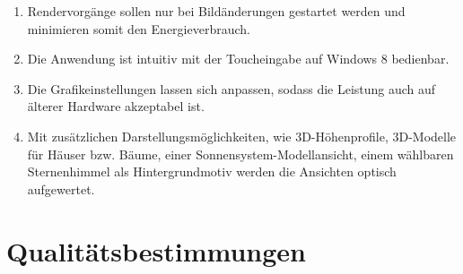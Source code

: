 \documentclass[10pt]{scrreprt}
\begin{document}
\begin{enumerate}[leftmargin=2.2cm]
\item Rendervorgänge sollen nur bei Bildänderungen gestartet werden und minimieren somit den Energieverbrauch.
\item Die Anwendung ist intuitiv mit der Toucheingabe auf Windows 8 bedienbar.
\item Die Grafikeinstellungen lassen sich anpassen, sodass die Leistung auch auf älterer Hardware akzeptabel ist.
\item Mit zusätzlichen Darstellungsmöglichkeiten, wie 3D-Höhenprofile, 3D-Modelle für Häuser bzw. Bäume, einer Sonnensystem-Modellansicht, einem wählbaren Sternenhimmel als Hintergrundmotiv werden die Ansichten optisch aufgewertet.
\end{enumerate}



\chapter{Qualitätsbestimmungen}
\end{document}
